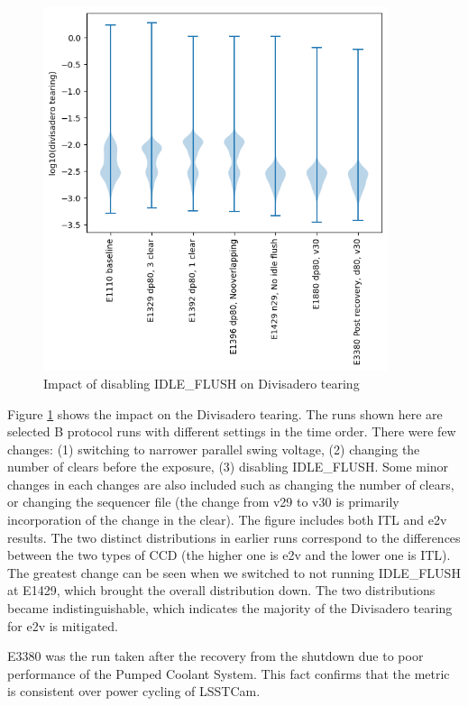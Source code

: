 \begin{figure}
\begin{centering}
\includegraphics[width=0.9\textwidth]{figures/divisadero.png}
\end{centering}
\caption{Impact of disabling IDLE\_FLUSH on Divisadero tearing}\label{IdleFlushEffect:divisadero}
\end{figure}
Figure \ref{IdleFlushEffect:divisadero} shows the impact on the Divisadero tearing. The runs shown here are selected B protocol runs with different settings in the time order. There were few changes: (1) switching to narrower parallel swing voltage, (2) changing the number of clears before the exposure, (3) disabling IDLE\_FLUSH.  Some minor changes in each changes are also included such as changing the number of clears, or changing the sequencer file (the change from v29 to v30  is primarily incorporation of the change in the clear). The figure includes both ITL and e2v results. The two distinct distributions in earlier runs correspond to the differences between the two types of CCD (the higher one is e2v and the lower one is ITL). The greatest change can be seen when we switched to not running IDLE\_FLUSH at E1429, which brought the overall distribution down. The two distributions became indistinguishable, which indicates the majority of the Divisadero tearing for e2v is mitigated.

E3380 was the run taken after the recovery from the shutdown due to poor performance of the Pumped Coolant System. This fact confirms that the metric is consistent over power cycling of LSSTCam.

